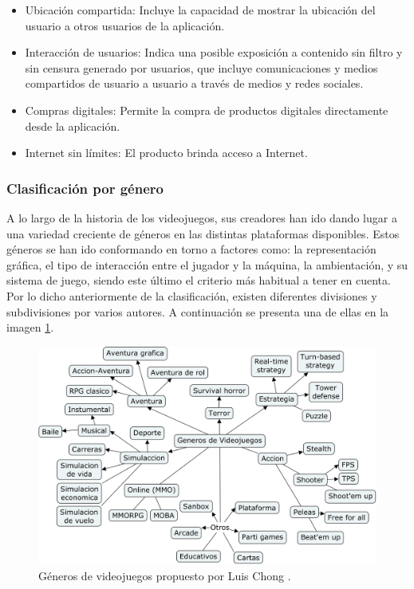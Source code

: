 			
			\begin{itemize}
			
			\item Ubicación compartida: Incluye la capacidad de mostrar la ubicación del usuario a otros usuarios de la aplicación.
			\item Interacción de usuarios: Indica una posible exposición a contenido sin filtro y sin censura generado por usuarios, que incluye comunicaciones y medios compartidos de usuario a usuario a través de medios y redes sociales.
			\item Compras digitales: Permite la compra de productos digitales directamente desde la aplicación.
			\item Internet sin límites: El producto brinda acceso a Internet.
		\end{itemize}
		
	\subsubsection{Clasificación por género}
	A lo largo de la historia de los videojuegos, sus creadores han ido dando lugar a una variedad creciente de géneros en las distintas plataformas disponibles. Estos géneros se han ido conformando en torno a factores como: la representación gráfica, el tipo de interacción entre el jugador y la máquina, la ambientación, y su sistema de juego, siendo este último el criterio más habitual a tener en cuenta. Por lo dicho anteriormente de la clasificación, existen diferentes divisiones y subdivisiones por varios autores. A continuación se presenta una de ellas en la imagen \ref{fig:vidGen}.
	\\[1pt]
	
	\begin{figure}
		\centering
		\includegraphics[width=\textwidth]{03MarcoTeorico/imageR/gene.png}
		\caption{Géneros de videojuegos propuesto por Luis Chong \cite{vid12}.}
		\label{fig:vidGen}
	\end{figure}	
	
